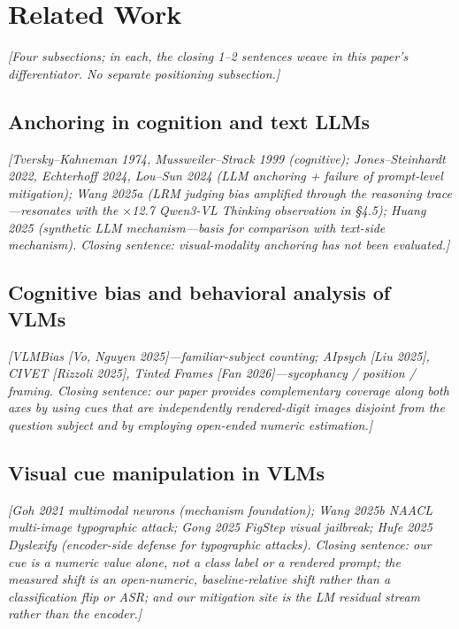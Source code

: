 \documentclass[11pt]{article}
\newcommand{\todoNote}[1]{\textit{\textcolor[rgb]{0.45,0.45,0.45}{[#1]}}}
\begin{document}
\section{Related Work}
\todoNote{Four subsections; in each, the closing 1--2 sentences weave in this paper's differentiator. No separate positioning subsection.}

\subsection{Anchoring in cognition and text LLMs}
\todoNote{Tversky--Kahneman 1974, Mussweiler--Strack 1999 (cognitive); Jones--Steinhardt 2022, Echterhoff 2024, Lou--Sun 2024 (LLM anchoring + failure of prompt-level mitigation); Wang 2025a (LRM judging bias amplified through the reasoning trace---resonates with the $\times$12.7 Qwen3-VL Thinking observation in \S4.5); Huang 2025 (synthetic LLM mechanism---basis for comparison with text-side mechanism). Closing sentence: visual-modality anchoring has not been evaluated.}

\subsection{Cognitive bias and behavioral analysis of VLMs}
\todoNote{VLMBias [Vo, Nguyen 2025]---familiar-subject counting; AIpsych [Liu 2025], CIVET [Rizzoli 2025], Tinted Frames [Fan 2026]---sycophancy / position / framing. Closing sentence: our paper provides complementary coverage along both axes by using cues that are \textit{independently rendered-digit images} disjoint from the question subject and by employing open-ended numeric estimation.}

\subsection{Visual cue manipulation in VLMs}
\todoNote{Goh 2021 multimodal neurons (mechanism foundation); Wang 2025b NAACL multi-image typographic attack; Gong 2025 FigStep visual jailbreak; Hufe 2025 Dyslexify (encoder-side defense for typographic attacks). Closing sentence: our cue is a \textit{numeric value alone}, not a class label or a rendered prompt; the measured shift is an \textit{open-numeric, baseline-relative shift} rather than a classification flip or ASR; and our mitigation site is the LM residual stream rather than the encoder.}
\end{document}
